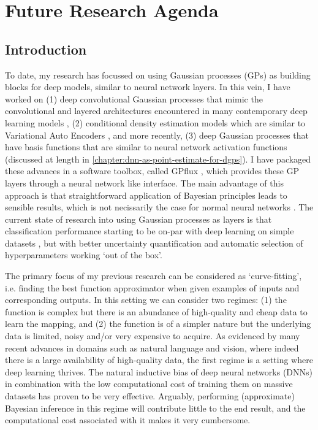 \graphicspath{{Chapter5/Figs/}}

\chapter{Future Research Agenda}
\label{chapter:future-research}

\section{Introduction}
To date, my research has focussed on using Gaussian processes (GPs) as building blocks for deep models, similar to neural network layers. In this vein, I have worked on (1) deep convolutional Gaussian processes that mimic the convolutional and layered architectures encountered in many contemporary deep learning models \citep{Dutordoir2020convolutional}, (2) conditional density estimation models which are similar to Variational Auto Encoders \citep{dutordoir2018cde,Salimbeni2019}, and more recently, (3) deep Gaussian processes that have basis functions that are similar to neural network activation functions \citep{dutordoir2021deep} (discussed at length in \cref{chapter:dnn-as-point-estimate-for-dgps}). I have packaged these advances in a software toolbox, called GPflux \citep{dutordoir2021gpflux}, which provides these GP layers through a neural network like interface. The main advantage of this approach is that straightforward application of Bayesian principles leads to sensible results, which is not necissarily the case for normal neural networks \citep{wenzel2020good}. The current state of research into using Gaussian processes as layers is that classification performance starting to be on-par with deep learning on simple datasets \citep{dutordoir2018cde}, but with better uncertainty quantification and automatic selection of hyperparameters working `out of the box'.

The primary focus of my previous research can be considered as `curve-fitting', i.e. finding the best function approximator when given examples of inputs and corresponding outputs. In this setting we can consider two regimes: (1) the function is complex but there is an abundance of high-quality and cheap data to learn the mapping, and (2) the function is of a simpler nature but the underlying data is limited, noisy and/or very expensive to acquire. As evidenced by many recent advances in domains such as natural language and vision, where indeed there is a large availability of high-quality data, the first regime is a setting where deep learning thrives. The natural inductive bias of deep neural networks (DNNs) in combination with the low computational cost of training them on massive datasets has proven to be very effective. Arguably, performing (approximate) Bayesian inference in this regime will contribute little to the end result, and the computational cost associated with it makes it very cumbersome. 

